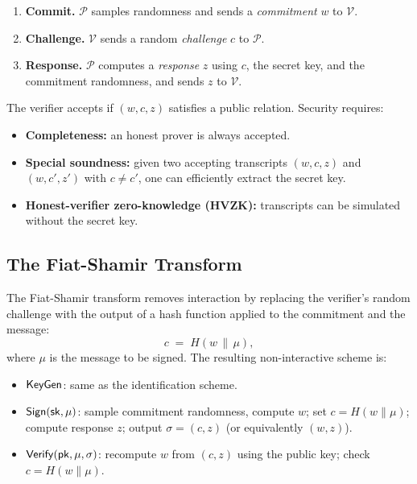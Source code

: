 \begin{enumerate}
\item \textbf{Commit.}  $\mathcal{P}$ samples randomness and sends a \emph{commitment} $w$ to $\mathcal{V}$.
\item \textbf{Challenge.}  $\mathcal{V}$ sends a random \emph{challenge} $c$ to $\mathcal{P}$.
\item \textbf{Response.}  $\mathcal{P}$ computes a \emph{response} $z$ using $c$, the secret key, and the commitment randomness, and sends $z$ to $\mathcal{V}$.
\end{enumerate}

\noindent The verifier accepts if $(w, c, z)$ satisfies a public relation.  Security requires:
\begin{itemize}
\item \textbf{Completeness:} an honest prover is always accepted.
\item \textbf{Special soundness:} given two accepting transcripts $(w, c, z)$ and $(w, c', z')$ with $c \neq c'$, one can efficiently extract the secret key.
\item \textbf{Honest-verifier zero-knowledge (HVZK):} transcripts can be simulated without the secret key.
\end{itemize}

\subsection{The Fiat-Shamir Transform}
\label{subsec:fs-transform}

The Fiat-Shamir transform removes interaction by replacing the verifier's random challenge with the output of a hash function applied to the commitment and the message:
\begin{equation}
\label{eq:fs-transform}
c \;=\; H(w \,\|\, \mu),
\end{equation}
where $\mu$ is the message to be signed.  The resulting non-interactive scheme is:

\begin{itemize}
\item $\mathsf{KeyGen}$: same as the identification scheme.
\item $\mathsf{Sign}(\mathsf{sk}, \mu)$: sample commitment randomness, compute $w$; set $c = H(w \| \mu)$; compute response $z$; output $\sigma = (c, z)$ (or equivalently $(w, z)$).
\item $\mathsf{Verify}(\mathsf{pk}, \mu, \sigma)$: recompute $w$ from $(c, z)$ using the public key; check $c = H(w \| \mu)$.
\end{itemize}


